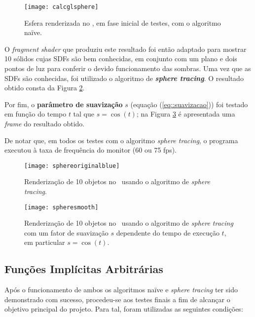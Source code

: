 \begin{figure}[!htbp]
	\centering
	\texttt{[image: calcglsphere]}
	\caption[Esfera no \theapp~com algoritmo naïve]{Esfera renderizada no \theapp, em fase inicial de testes, com o algoritmo naïve.}
	\label{fig::calcglsphere}
\end{figure}

O \textit{fragment shader} que produziu este resultado foi então adaptado para mostrar 10 sólidos cujas \acfp{SDF} são bem conhecidas, em conjunto com um plano e dois pontos de luz para conferir o devido funcionamento das sombras. Uma vez que as \acsp{SDF} são conhecidas, foi utilizado o algoritmo de \textbf{\itshape sphere tracing}. O resultado obtido consta da Figura \ref{fig::sphereoriginalblue}.

Por fim, o \textbf{parâmetro de suavização} $s$ (equação (\ref{eq::suavizacao})) foi testado em função do tempo $t$ tal que $s = \cos(t)$; na Figura \ref{fig::spheresmooth} é apresentada uma \textit{frame} do resultado obtido.

De notar que, em todos os testes com o algoritmo \textit{sphere tracing}, o programa executou à taxa de frequência do monitor (60 ou 75 \acf{fps}).

\begin{figure}[!htbp]
	\centering
	\texttt{[image: sphereoriginalblue]}
	\caption[Dez objetos com \textit{sphere tracing} no \theapp]{Renderização de 10 objetos no \theapp~usando o algoritmo de \textit{sphere tracing}.}
	\label{fig::sphereoriginalblue}
\end{figure}

\begin{figure}[!htbp]
	\centering
	\texttt{[image: spheresmooth]}
	\caption[Dez objetos com \textit{sphere tracing} e suavização no \theapp]{Renderização de 10 objetos no \theapp~usando o algoritmo de \textit{sphere tracing} com um fator de suavização $s$ dependente do tempo de execução $t$, em particular $s = \cos(t)$.}
	\label{fig::spheresmooth}
\end{figure}


\subsection{Funções Implícitas Arbitrárias}
\label{ssec::testes:hardware:final}

Após o funcionamento de ambos os algoritmos naïve e \textit{sphere tracing} ter sido demonstrado com sucesso, procedeu-se aos testes finais a fim de alcançar o objetivo principal do projeto. Para tal, foram utilizadas as seguintes condições:

